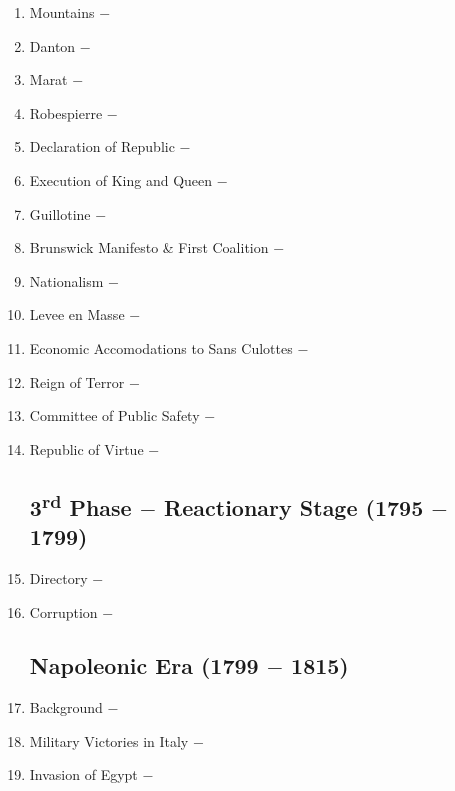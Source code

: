 \documentclass[12pt]{article}
\begin{document}
\begin{enumerate}
\item Mountains $-$ 

\item Danton $-$ 

\item Marat $-$ 

\item Robespierre $-$ 

\item Declaration of Republic $-$ 

\item Execution of King and Queen $-$ 

\item Guillotine $-$ 

\item Brunswick Manifesto \& First Coalition $-$ 

\item Nationalism $-$ 

\item Levee en Masse $-$ 

\item Economic Accomodations to Sans Culottes $-$

\item Reign of Terror $-$ 

\item Committee of Public Safety $-$ 

\item Republic of Virtue $-$ 

\subsection{3\textsuperscript{rd} Phase $-$ Reactionary Stage (1795 $-$ 1799)}

\item Directory $-$ 

\item Corruption $-$ 

\subsection{Napoleonic Era (1799 $-$ 1815)}

\item Background $-$ 

\item Military Victories in Italy $-$ 

\item Invasion of Egypt $-$ 


\end{enumerate}
\end{document}
